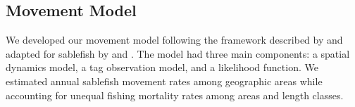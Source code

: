 \documentclass{article}
\begin{document}
\subsection{Movement Model}
We developed our movement model following the framework described by \cite{hilborn1990} and adapted for sablefish by \cite{heifetz1991} and \cite{hanselman2015}. The model had three main components: a spatial dynamics model, a tag observation model, and a likelihood function. We estimated annual sablefish movement rates among geographic areas while accounting for unequal fishing mortality rates among areas and length classes.


\end{document}

